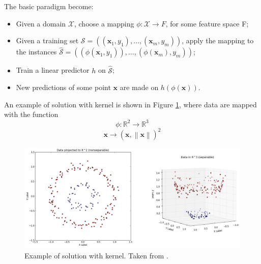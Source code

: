 The basic paradigm become:
\begin{itemize}
	\item Given a domain $\mathcal{X}$, choose a mapping $\phi : \mathcal{X} \rightarrow F$, for some feature space F;
	\item Given a training set $\mathcal{S} = ((\mathbf{x}_1, y_1), \dots , (\mathbf{x}_m, y_m))$, apply the mapping to the instances $\hat{\mathcal{S}} = ((\phi(\mathbf{x}_1, y_1)), \dots , (\phi(\mathbf{x}_m), y_m))$;
	\item Train a linear predictor $h$ on $\hat{\mathcal{S}}$;
	\item New predictions of some point $\mathbf{x}$ are made on $h(\phi (\mathbf{x}))$.
\end{itemize}

An example of solution with kernel is shown in Figure \ref{fig:kernel-3d}, where data are mapped with the function 
\[ \phi : \mathbb{R}^2 \rightarrow \mathbb{R}^3 \]
\[ \mathbf{x} \rightarrow (\mathbf{x}, \left\lVert \mathbf{x} \right\rVert)^2 \]

\begin{figure}[ht]
	\centering
	\includegraphics[width=1\textwidth]{figures/kernel-3d.png}
	\caption{Example of solution with kernel. Taken from \cite{kernel-non-sep}.}
	\label{fig:kernel-3d}
\end{figure}


